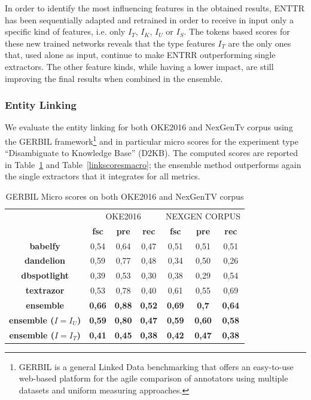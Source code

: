 \documentclass{llncs}
\newcommand{\tabref}[1]{\mbox{Table~\ref{#1}}}
\begin{document}
In order to identify the most influencing features in the obtained results, ENTTR has been sequentially adapted and retrained in order to receive in input only a specific kind of features, i.e. only $I_T$, $I_K$, $I_U$ or $I_S$. The tokens based scores for these new trained networks reveals that the type features \textit{$I_T$} are the only ones that, used alone as input, continue to make ENTRR outperforming single extractors. The other feature kinds, while having a lower impact, are still improving the final results when combined in the ensemble.

\subsubsection{Entity Linking}

We evaluate the entity linking for both OKE2016 and NexGenTv corpus using the GERBIL framework\footnote{GERBIL is a general Linked Data benchmarking that offers an easy-to-use web-based platform for the agile comparison of annotators using multiple datasets and uniform measuring approaches.} and in particular micro scores for the experiment type ``Disambiguate to Knowledge Base'' (D2KB). The computed scores are reported in \tabref{linkscores} and \tabref{linkscoresmacro}; the ensemble method outperforms again the single extractors that it integrates for all metrics.


\begin{table}
      \centering
      \setlength{\tabcolsep}{12pt}
        \begin{tabular}{c|c|c|c|c|c|c|}
          \multicolumn{1}{c}{ } &
          \multicolumn{3}{|c|}{OKE2016} & 
          \multicolumn{3}{|c|}{NEXGEN CORPUS} \\
           \multicolumn{1}{c|}{ } & \textbf{fsc} & \textbf{pre} & \textbf{rec}
           & \textbf{fsc} & \textbf{pre} & \textbf{rec} \\ \hline
            \textbf{babelfy}         & 0,54  & 0,64   & 0,47  & 0,51  & 0,51 & 0,51  \\ \hline
            \textbf{dandelion}       & 0,59   & 0,77   & 0,48 & 0,34  & 0,50  & 0,26 \\ \hline
            \textbf{dbspotlight}     & 0,39   & 0,53   & 0,30 & 0,38   & 0,29  & 0,54 \\ \hline
            \textbf{textrazor}       & 0,53   & 0,78   & 0,40 & 0,61  & 0,55  & 0,69 \\ \hline \hline
            \textbf{ensemble}        & \textbf{0,66}   & \textbf{0,88}   & \textbf{0,52}  & \textbf{0,69} & \textbf{0,7}  & \textbf{0,64} \\ \hline
            \textbf{ensemble ($I=I_U$)}        & \textbf{0,59}   & \textbf{0,80}   & \textbf{0,47}  & \textbf{0,59} & \textbf{0,60}  & \textbf{0,58} \\ \hline
            \textbf{ensemble ($I=I_T$)}        & \textbf{0,41}   & \textbf{0,45}   & \textbf{0,38}  & \textbf{0,42} & \textbf{0,47}  & \textbf{0,38} \\ \hline
        \end{tabular}
    \caption{GERBIL Micro scores on both OKE2016 and NexGenTV corpus}
    \label{linkscores}
\end{table}
\end{document}
